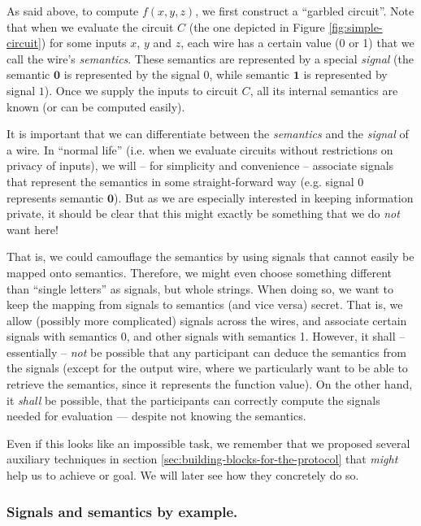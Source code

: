 As said above, to compute $f(x,y,z)$, we first construct a ``garbled circuit''. Note that when we evaluate the circuit $C$ (the one depicted in Figure \ref{fig:simple-circuit}) for some inputs $x$, $y$ and $z$, each wire has a certain value (0 or 1) that we call the wire's \emph{semantics}. These semantics are represented by a special \emph{signal} (the semantic $\mathbf{0}$ is represented by the signal $0$, while semantic $\mathbf{1}$ is represented by signal $1$). Once we supply the inputs to circuit $C$, all its internal semantics are known (or can be computed easily).

It is important that we can differentiate between the \emph{semantics} and the \emph{signal} of a wire. In ``normal life'' (i.e. when we evaluate circuits without restrictions on privacy of inputs), we will -- for simplicity and convenience -- associate signals that represent the semantics in some straight-forward way (e.g. signal $0$ represents semantic $\mathbf{0}$). But as we are especially interested in keeping information private, it should be clear that this might exactly be something that we do \emph{not} want here!

That is, we could camouflage the semantics by using signals that cannot easily be mapped onto semantics. Therefore, we might even choose something different than ``single letters'' as signals, but whole strings. When doing so, we want to keep the mapping from signals to semantics (and vice versa) secret. That is, we allow (possibly more complicated) signals across the wires, and associate certain signals with semantics 0, and other signals with semantics 1. However, it shall -- essentially -- \emph{not} be possible that any participant can deduce the semantics from the signals (except for the output wire, where we particularly want to be able to retrieve the semantics, since it represents the function value). On the other hand, it \emph{shall} be possible, that the participants can correctly compute the signals needed for evaluation --- despite not knowing the semantics.

Even if this looks like an impossible task, we remember that we proposed several auxiliary techniques in section \ref{sec:building-blocks-for-the-protocol} that \emph{might} help us to achieve or goal. We will later see how they concretely do so.

\subsubsection{Signals and semantics by example.}
\label{sec:signals-semantics-by-example}


